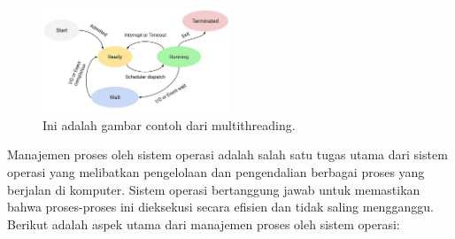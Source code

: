 \documentclass[12pt]{article}
\begin{document}
\begin{figure}[h]
    \centering
    \includegraphics[width=0.5\textwidth]{asset/menejemen.jpg}  %
    \caption{Ini adalah gambar contoh dari multithreading.}
    \label{fig:contoh_gambar}
\end{figure}
Manajemen proses oleh sistem operasi adalah salah satu tugas utama dari sistem operasi yang melibatkan pengelolaan dan pengendalian berbagai proses yang berjalan di komputer. Sistem operasi bertanggung jawab untuk memastikan bahwa proses-proses ini dieksekusi secara efisien dan tidak saling mengganggu. Berikut adalah aspek utama dari manajemen proses oleh sistem operasi:
\end{document}
